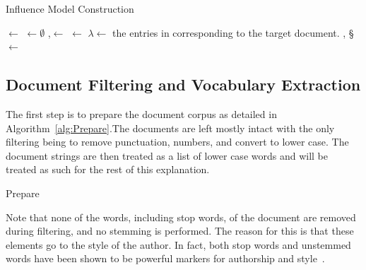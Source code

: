 \documentclass[../ut-dissertation.tex]{subfiles}
\begin{document}
\begin{algorithm}[p]
  \caption{Influence Model Construction}
  \label{alg:model}
  
   
   
   
  
  \Output{\W, \S, \F}
  \BlankLine
  \;
  \V $\leftarrow$ \;
  \C $\leftarrow\emptyset$\;
  \LN,\F $\leftarrow$ \;
  \DM $\leftarrow$ \DistanceMatrix{\F}\;
  $\lambda \leftarrow$ the entries in \LN corresponding to the target document.\;
  \W, \S $\leftarrow$ \;
  \Return{\W, \S, \F}\;

\end{algorithm}

\subsection{Document Filtering and Vocabulary Extraction}
The first step is to prepare the document corpus as detailed in
Algorithm~\ref{alg:Prepare}.The documents are
left mostly intact with the only filtering being to remove punctuation,
numbers, and convert to lower case.  The document strings are then
treated as a list of lower case words and will be treated as such for
the rest of this explanation.

\begin{algorithm}[p]
  \caption{Prepare}
  \label{alg:Prepare}
  \BlankLine
\end{algorithm}

Note that none of the words, including stop words, of the document are
removed during filtering, and no stemming is performed.  The reason
for this is that these elements go to the style of the author.  In
fact, both stop words and unstemmed words have been shown to be
powerful markers for authorship and style~\cite{antonia2014,
  stamatatos2011, burrows2017}.  
\end{document}
